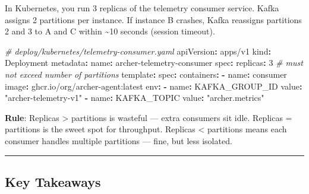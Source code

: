 \documentclass[
]{article}
\newenvironment{Shaded}{}{}
\newcommand{\AttributeTok}[1]{\textcolor[rgb]{0.49,0.56,0.16}{#1}}
\newcommand{\CommentTok}[1]{\textcolor[rgb]{0.38,0.63,0.69}{\textit{#1}}}
\newcommand{\DecValTok}[1]{\textcolor[rgb]{0.25,0.63,0.44}{#1}}
\newcommand{\FunctionTok}[1]{\textcolor[rgb]{0.02,0.16,0.49}{#1}}
\newcommand{\KeywordTok}[1]{\textcolor[rgb]{0.00,0.44,0.13}{\textbf{#1}}}
\newcommand{\StringTok}[1]{\textcolor[rgb]{0.25,0.44,0.63}{#1}}
\begin{document}
In Kubernetes, you run 3 replicas of the telemetry consumer service.
Kafka assigns 2 partitions per instance. If instance B crashes, Kafka
reassigns partitions 2 and 3 to A and C within \textasciitilde10 seconds
(session timeout).

\begin{Shaded}
\begin{Highlighting}[]
\CommentTok{\# deploy/kubernetes/telemetry{-}consumer.yaml}
\FunctionTok{apiVersion}\KeywordTok{:}\AttributeTok{ apps/v1}
\FunctionTok{kind}\KeywordTok{:}\AttributeTok{ Deployment}
\FunctionTok{metadata}\KeywordTok{:}
\AttributeTok{  }\FunctionTok{name}\KeywordTok{:}\AttributeTok{ archer{-}telemetry{-}consumer}
\FunctionTok{spec}\KeywordTok{:}
\AttributeTok{  }\FunctionTok{replicas}\KeywordTok{:}\AttributeTok{ }\DecValTok{3}\CommentTok{  \# must not exceed number of partitions}
\AttributeTok{  }\FunctionTok{template}\KeywordTok{:}
\AttributeTok{    }\FunctionTok{spec}\KeywordTok{:}
\AttributeTok{      }\FunctionTok{containers}\KeywordTok{:}
\AttributeTok{      }\KeywordTok{{-}}\AttributeTok{ }\FunctionTok{name}\KeywordTok{:}\AttributeTok{ consumer}
\AttributeTok{        }\FunctionTok{image}\KeywordTok{:}\AttributeTok{ ghcr.io/org/archer{-}agent:latest}
\AttributeTok{        }\FunctionTok{env}\KeywordTok{:}
\AttributeTok{        }\KeywordTok{{-}}\AttributeTok{ }\FunctionTok{name}\KeywordTok{:}\AttributeTok{ KAFKA\_GROUP\_ID}
\AttributeTok{          }\FunctionTok{value}\KeywordTok{:}\AttributeTok{ }\StringTok{"archer{-}telemetry{-}v1"}
\AttributeTok{        }\KeywordTok{{-}}\AttributeTok{ }\FunctionTok{name}\KeywordTok{:}\AttributeTok{ KAFKA\_TOPIC}
\AttributeTok{          }\FunctionTok{value}\KeywordTok{:}\AttributeTok{ }\StringTok{"archer.metrics"}
\end{Highlighting}
\end{Shaded}

\textbf{Rule}: Replicas \textgreater{} partitions is wasteful --- extra
consumers sit idle. Replicas = partitions is the sweet spot for
throughput. Replicas \textless{} partitions means each consumer handles
multiple partitions --- fine, but less isolated.

\begin{center}\rule{0.5\linewidth}{0.5pt}\end{center}

\hypertarget{key-takeaways-2}{%
\subsection{Key Takeaways}\label{key-takeaways-2}}
\end{document}
